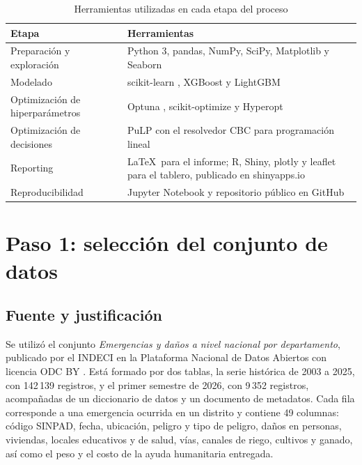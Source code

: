 \documentclass[12pt,a4paper]{article}
\begin{document}
\begin{table}[H]\centering\small
\caption{Herramientas utilizadas en cada etapa del proceso}\label{tab:herramientas}
\begin{tabularx}{\textwidth}{L{3.1cm}Y}
\toprule
Etapa & Herramientas \\
\midrule
Preparación y exploración & Python 3, pandas, NumPy, SciPy, Matplotlib y Seaborn \\
Modelado & scikit-learn \citep{pedregosa2011}, XGBoost \citep{chen2016} y LightGBM \citep{ke2017} \\
Optimización de hiperparámetros & Optuna \citep{akiba2019}, scikit-optimize y Hyperopt \citep{bergstra2015} \\
Optimización de decisiones & PuLP con el resolvedor CBC para programación lineal \\
Reporting & \LaTeX\ para el informe; R, Shiny, plotly y leaflet para el tablero, publicado en shinyapps.io \\
Reproducibilidad & Jupyter Notebook y repositorio público en GitHub \\
\bottomrule
\end{tabularx}
\end{table}

\section{Paso 1: selección del conjunto de datos}\label{sec:datos}

\subsection{Fuente y justificación}

Se utilizó el conjunto \emph{Emergencias y daños a nivel nacional por departamento}, publicado por el INDECI en la
Plataforma Nacional de Datos Abiertos con licencia ODC BY \citep{indeci2026}. Está formado por dos tablas, la serie
histórica de 2003 a 2025, con 142\,139 registros, y el primer semestre de 2026, con 9\,352 registros, acompañadas
de un diccionario de datos y un documento de metadatos. Cada fila corresponde a una emergencia ocurrida en un
distrito y contiene 49 columnas: código SINPAD, fecha, ubicación, peligro y tipo de peligro, daños en personas,
viviendas, locales educativos y de salud, vías, canales de riego, cultivos y ganado, así como el peso y el costo de
la ayuda humanitaria entregada.
\end{document}
